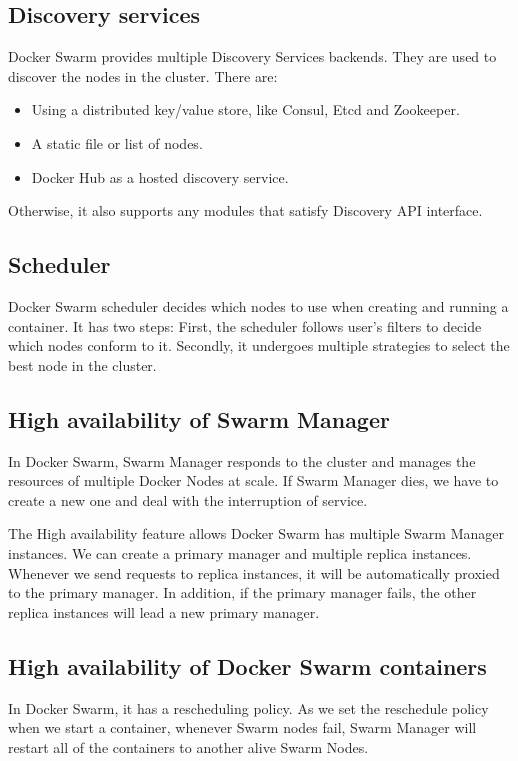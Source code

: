 \subsection{Discovery services}
Docker Swarm provides multiple Discovery Services backends. They are used to discover the nodes in the cluster. There are:
\begin{itemize}
    \item Using a distributed key/value store, like Consul, Etcd and Zookeeper.
    \item A static file or list of nodes.
    \item Docker Hub as a hosted discovery service.
\end{itemize}
Otherwise, it also supports any modules that satisfy Discovery API interface.

\subsection{Scheduler}
Docker Swarm scheduler decides which nodes to use when creating and running a container. It has two steps:
First, the scheduler follows user's filters to decide which nodes conform to it.
Secondly, it undergoes multiple strategies to select the best node in the cluster.

\subsection{High availability of Swarm Manager}
In Docker Swarm, Swarm Manager responds to the cluster and manages the resources of multiple Docker Nodes at scale. If Swarm Manager dies, we have to create a new one and deal with the interruption of service.

The High availability feature allows Docker Swarm has multiple Swarm Manager instances. We can create a primary manager and multiple replica instances.
Whenever we send requests to replica instances, it will be automatically proxied to the primary manager.
In addition, if the primary manager fails, the other replica instances will lead a new primary manager.

\subsection{High availability of Docker Swarm containers}
In Docker Swarm, it has a rescheduling policy. As we set the reschedule policy when we start a container, whenever Swarm nodes fail, Swarm Manager will restart all of the containers to another alive Swarm Nodes.
